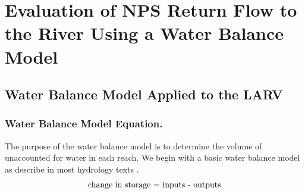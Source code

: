 \renewcommand{\thechapter}{4}
\chapter{Evaluation of NPS Return Flow to the River Using a Water Balance Model}
\label{chap:WaterBalanceModel}

\begin{linenumbers}
\section{Water Balance Model Applied to the LARV}
\label{sec:AppliedWaterModel}

\subsection*{Water Balance Model Equation.}
The purpose of the water balance model is to determine the volume of unaccounted for water in each reach.  We begin with a basic water balance model as describe in most hydrology texts \parencite{wanielista1997}.
\begin{equation}
	\textnormal{change in storage = inputs - outputs} \nonumber
\end{equation}


\end{linenumbers}
